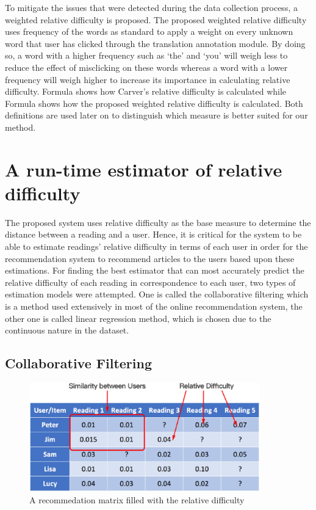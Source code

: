 To mitigate the issues that were detected during the data collection process, a weighted relative difficulty is proposed. The proposed weighted relative difficulty uses frequency of the words as standard to apply a weight on every unknown word that user has clicked through the translation annotation module. By doing so, a word with a higher frequency such as ‘the' and ‘you' will weigh less to reduce the effect of misclicking on these words whereas a word with a lower frequency will weigh higher to increase its importance in calculating relative difficulty. Formula shows how Carver's relative difficulty is calculated while Formula shows how the proposed weighted relative difficulty is calculated. Both definitions are used later on to distinguish which measure is better suited for our method.

\section{A run-time estimator of relative difficulty}

The proposed system uses relative difficulty as the base measure to determine the distance between a reading and a user. Hence, it is critical for the system to be able to estimate readings' relative difficulty in terms of each user in order for the recommendation system to recommend articles to the users based upon these estimations. For finding the best estimator that can most accurately predict the relative difficulty of each reading in correspondence to each user, two types of estimation models were attempted. One is called the collaborative filtering which is a method used extensively in most of the online recommendation system, the other one is called linear regression method, which is chosen due to the continuous nature in the dataset.

\subsection{Collaborative Filtering}

\begin{figure}[tbp]
 \begin{center}
  \includegraphics[width=100mm]{relative_difficulty_matrix.eps}
 \end{center}
 \caption{\label{figure:relative_difficulty_matrix} A recommedation matrix filled with the relative difficulty}
\end{figure}

